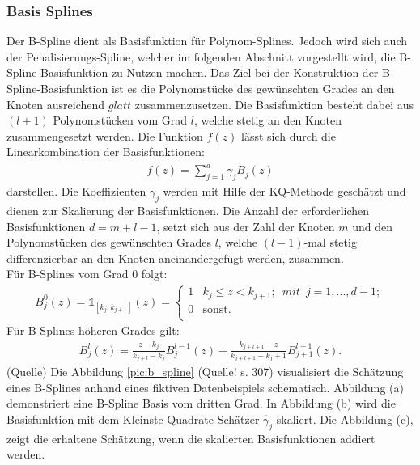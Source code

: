 \subsubsection{Basis Splines}
Der B-Spline dient als Basisfunktion für Polynom-Splines. Jedoch wird sich auch der Penalisierungs-Spline, welcher im folgenden Abschnitt vorgestellt wird, die B-Spline-Basisfunktion zu Nutzen machen. Das Ziel bei der Konstruktion der B-Spline-Basisfunktion ist es die Polynomstücke des gewünschten Grades an den Knoten ausreichend $glatt$ zusammenzusetzen. Die Basisfunktion besteht dabei aus $(l+1)$ Polynomstücken vom Grad $l$, welche stetig an den Knoten zusammengesetzt werden. Die Funktion $f(z)$ lässt sich durch die Linearkombination der Basisfunktionen:
\begin{align}
f(z)=\sum_{j=1}^d\gamma_{j}B_{j}(z)
\end{align}
darstellen. Die Koeffizienten  $\gamma_{j}$ werden mit Hilfe der KQ-Methode geschätzt und dienen zur Skalierung der Basisfunktionen. Die Anzahl der erforderlichen Basisfunktionen $d = m+l-1$, setzt sich aus der Zahl der Knoten $m$ und den Polynomstücken des gewünschten Grades $l$, welche $(l-1)$-mal stetig differenzierbar an den Knoten aneinandergefügt werden, zusammen.  \\
Für B-Splines vom Grad 0 folgt:
\begin{align}
B_{j}^0(z)= \mathbb{1}_{[k_{j},k_{j+1}]}(z)= 
\begin{cases}
1 & k_{j} \leq z<k_{j+1};\enspace mit\enspace j=1,...,d-1; \\
0 & \text{sonst.} \\
\end{cases}
\end{align}
Für B-Splines höheren Grades gilt:
\begin{align}
B_{j}^l(z)= \frac{z-k_{j}}{k_{j+l}-k_{j}}B_{j}^{l-1}(z)+
\frac{k_{j+l+1}-z}{k_{j+l+1}-k_j+1}B_{j+1}^{l-1}(z).
\end{align}
(Quelle)
Die Abbildung \ref{pic:b_spline} (Quelle! s. 307) visualisiert die Schätzung eines B-Splines anhand eines fiktiven Datenbeispiels schematisch. Abbildung (a) demonstriert eine B-Spline Basis vom dritten Grad. In Abbildung (b) wird die Basisfunktion mit dem Kleinste-Quadrate-Schätzer $\hat\gamma_{j}$ skaliert. Die Abbildung (c), zeigt die erhaltene Schätzung, wenn die skalierten Basisfunktionen addiert werden.
